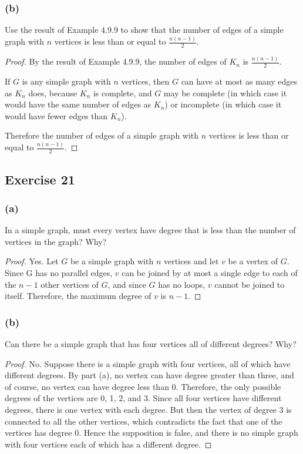 \documentclass[14pt]{extarticle}
\begin{document}
\subsubsection{(b)}
Use the result of Example 4.9.9 to show that the number of edges of a simple graph with $n$ vertices is less than or equal to $\frac{n(n - 1)}{2}$.

\begin{proof}
By the result of Example 4.9.9, the number of edges of $K_n$ is $\frac{n(n - 1)}{2}$.

If $G$ is any simple graph with $n$ vertices, then $G$ can have at most as many edges as $K_n$ does, because $K_n$ is complete, and $G$ may be complete (in which case it would have the same number of edges as $K_n$) or incomplete (in which case it would have fewer edges than $K_n$).

Therefore the number of edges of a simple graph with $n$ vertices is less than or equal to $\frac{n(n - 1)}{2}$.
\end{proof}

\subsection{Exercise 21}

\subsubsection{(a)}
In a simple graph, must every vertex have degree that is less than the number of vertices in the graph? Why?

\begin{proof}
Yes. Let $G$ be a simple graph with $n$ vertices and let $v$ be a vertex of $G$. Since G has no parallel edges, $v$ can be joined by at most a single edge to each of the $n - 1$ other vertices of $G$, and since $G$ has no loops, $v$ cannot be joined to itself. Therefore, the maximum degree of $v$ is $n - 1$.
\end{proof}

\subsubsection{(b)}
Can there be a simple graph that has four vertices all of different degrees? Why?

\begin{proof}
No. Suppose there is a simple graph with four vertices, all of which have different degrees. By part (a), no vertex can have degree greater than three, and of course, no vertex can have degree less than 0. Therefore, the only possible degrees of the vertices are 0, 1, 2, and 3. Since all four vertices have different degrees, there is one vertex with each degree. But then the vertex of degree 3 is connected to all the other vertices, which contradicts the fact that one of the vertices has degree 0. Hence the supposition is false, and there is no simple graph with four vertices each of which has a different degree.
\end{proof}
\end{document}
